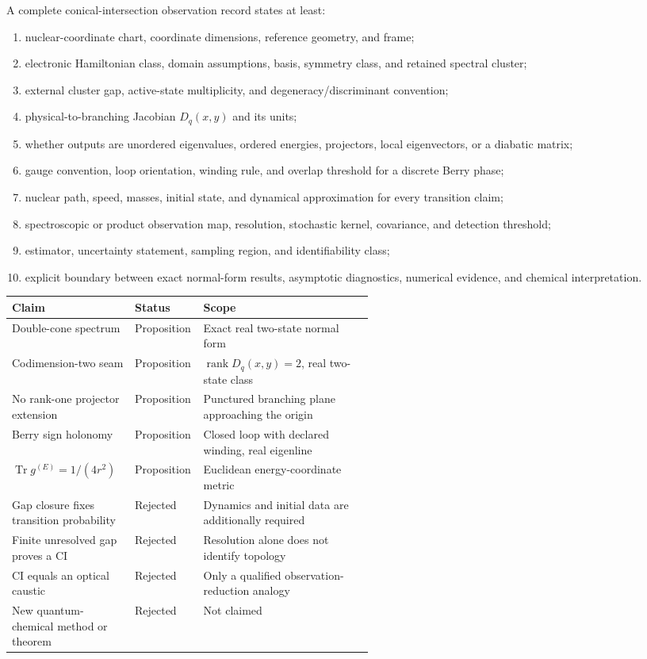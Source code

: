 \documentclass[11pt,a4paper]{article}
\theoremstyle{definition}
\theoremstyle{plain}
\theoremstyle{remark}
\newcommand{\Tr}{\operatorname{Tr}}
\newcommand{\rank}{\operatorname{rank}}
\begin{document}
A complete conical-intersection observation record states at least:
\begin{enumerate}[leftmargin=*,itemsep=2pt]
\item nuclear-coordinate chart, coordinate dimensions, reference
      geometry, and frame;
\item electronic Hamiltonian class, domain assumptions, basis,
      symmetry class, and retained spectral cluster;
\item external cluster gap, active-state multiplicity, and
      degeneracy/discriminant convention;
\item physical-to-branching Jacobian \(D_q(x,y)\) and its units;
\item whether outputs are unordered eigenvalues, ordered energies,
      projectors, local eigenvectors, or a diabatic matrix;
\item gauge convention, loop orientation, winding rule, and overlap
      threshold for a discrete Berry phase;
\item nuclear path, speed, masses, initial state, and dynamical
      approximation for every transition claim;
\item spectroscopic or product observation map, resolution,
      stochastic kernel, covariance, and detection threshold;
\item estimator, uncertainty statement, sampling region, and
      identifiability class;
\item explicit boundary between exact normal-form results,
      asymptotic diagnostics, numerical evidence, and chemical
      interpretation.
\end{enumerate}

\begin{table}[ht]
\centering
\small
\begin{tabularx}{\linewidth}{L{0.34\linewidth} L{0.19\linewidth} Y}
\toprule
Claim & Status & Scope \\
\midrule
Double-cone spectrum &
Proposition &
Exact real two-state normal form \\
Codimension-two seam &
Proposition &
\(\rank D_q(x,y)=2\), real two-state class \\
No rank-one projector extension &
Proposition &
Punctured branching plane approaching the origin \\
Berry sign holonomy &
Proposition &
Closed loop with declared winding, real eigenline \\
\(\Tr g^{(E)}=1/(4r^2)\) &
Proposition &
Euclidean energy-coordinate metric \\
Gap closure fixes transition probability &
Rejected &
Dynamics and initial data are additionally required \\
Finite unresolved gap proves a CI &
Rejected &
Resolution alone does not identify topology \\
CI equals an optical caustic &
Rejected &
Only a qualified observation-reduction analogy \\
New quantum-chemical method or theorem &
Rejected &
Not claimed \\
\bottomrule
\end{tabularx}
\end{table}
\end{document}
